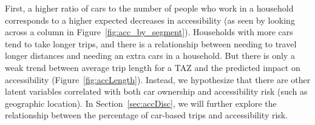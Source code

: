 








First, a higher ratio of cars to the number of people who work in a household corresponds to a higher expected decreases in accessibility (as seen by looking across a column in Figure~\ref{fig:acc_by_segment}).   
Households with more cars tend to take longer trips, and there is a relationship between needing to travel longer distances and needing an extra cars in a household. But there is only a weak trend between average trip length for a TAZ and the predicted impact on accessibility (Figure~\ref{fig:accLength}). Instead, we hypothesize that there are other latent variables correlated with both car ownership and accessibility risk (such as geographic location). In Section~\ref{sec:accDisc}, we will further explore the relationship between the percentage of car-based trips and accessibility risk.



